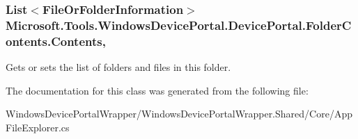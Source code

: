 \subsubsection[{\texorpdfstring{Contents}{Contents}}]{\setlength{\rightskip}{0pt plus 5cm}List$<${\bf File\+Or\+Folder\+Information}$>$ Microsoft.\+Tools.\+Windows\+Device\+Portal.\+Device\+Portal.\+Folder\+Contents.\+Contents\hspace{0.3cm}{\ttfamily [get]}, {\ttfamily [set]}}\hypertarget{class_microsoft_1_1_tools_1_1_windows_device_portal_1_1_device_portal_1_1_folder_contents_aafc71f3d95024b0a5f550a10585759ea}{}\label{class_microsoft_1_1_tools_1_1_windows_device_portal_1_1_device_portal_1_1_folder_contents_aafc71f3d95024b0a5f550a10585759ea}


Gets or sets the list of folders and files in this folder. 



The documentation for this class was generated from the following file\+:\begin{DoxyCompactItemize}
\item 
Windows\+Device\+Portal\+Wrapper/\+Windows\+Device\+Portal\+Wrapper.\+Shared/\+Core/App\+File\+Explorer.\+cs\end{DoxyCompactItemize}
